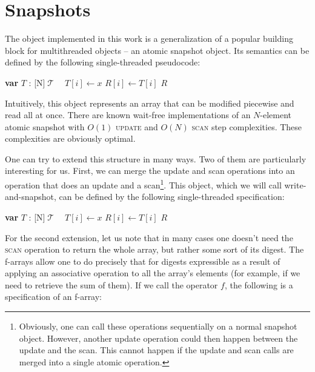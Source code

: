 \documentclass{thesis}
\def\T{\ensuremath{\operatorname{\mathcal{T}}}\text{ }}
\newcommand{\fn}[1]{\textsc{#1}}
\newcommand{\var}[2]{\textbf{var }#1 : #2}
\newcommand{\arrayspec}[1]{\text{array}[#1]\text{ of }}
\begin{document}
\section{Snapshots}

The object implemented in this work is a generalization of a popular building block for multithreaded objects
-- an atomic snapshot object\cite{snapshot-idea}. Its semantics can be defined by the following single-threaded pseudocode:

\begin{algorithmic}[1]
	\State\var{$T$}{\arrayspec{N}$\T$}
	\State $T[i] \gets x$
\EndFunction
{}
		\State $R[i] \gets T[i]$
	\EndFor
	\State\Return $R$
\EndFunction
\end{algorithmic}

Intuitively, this object represents an array that can be modified piecewise and read all at once.
There are known wait-free implementations of an $N$-element atomic snapshot with $O(1)$ \fn{update} and $O(N)$ \fn{scan} step complexities\cite{snapshot-impl}. These complexities are obviously
optimal.

One can try to extend this structure in many ways. Two of them are particularly interesting for us.
First, we can merge the update and scan operations
into an operation that does an update and a scan\footnote{Obviously, one can call these operations sequentially
on a normal snapshot object. However, another update operation could then happen between the update and the scan.
This cannot happen if the update and scan calls are merged into a single atomic operation.}.
This object, which we will call write-and-snapshot\cite{write-and-snap}, can be defined by the following single-threaded specification:

\begin{algorithmic}[1]
	\State\var{$T$}{\arrayspec{N}$\T$}
	\State $T[i] \gets x$
		\State $R[i] \gets T[i]$
	\EndFor
	\State\Return $R$
\EndFunction
\end{algorithmic}

For the second extension, let us note that in many cases one doesn't need the \fn{scan} operation to return the whole array, but rather some sort of its digest. The f-arrays\cite{f-array} allow one to do precisely that for digests expressible as
a result of applying an associative operation to all the array's elements (for example, if we need to retrieve the sum of them). If we call the operator $f$, the following is a specification of an f-array:
\end{document}
